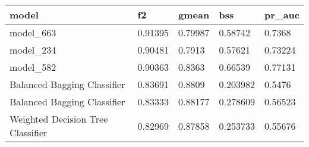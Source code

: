 \begin{tabular}{|l|l|l|l|l|}
\hline
\textbf{model}                    & \textbf{f2} & \textbf{gmean} & \textbf{bss} & \textbf{pr\_auc} \\ \hline
model\_663                        & 0.91395     & 0.79987        & 0.58742      & 0.7368           \\ \hline
model\_234                        & 0.90481     & 0.7913         & 0.57621      & 0.73224          \\ \hline
model\_582                        & 0.90363     & 0.8363         & 0.66539      & 0.77131          \\ \hline
Balanced Bagging Classifier       & 0.83691     & 0.8809         & 0.203982     & 0.5476           \\ \hline
Balanced Bagging Classifier       & 0.83333     & 0.88177        & 0.278609     & 0.56523          \\ \hline
Weighted Decision Tree Classifier & 0.82969     & 0.87858        & 0.253733     & 0.55676          \\ \hline
\end{tabular}